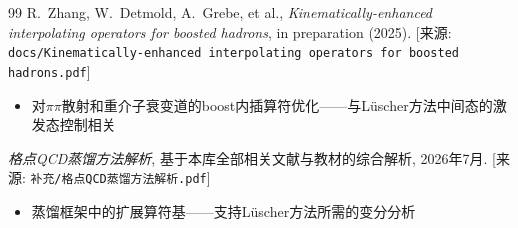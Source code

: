 \documentclass[12pt,a4paper]{ctexart}
\theoremstyle{definition}
\begin{document}
\begin{thebibliography}{99}
R.~Zhang, W.~Detmold, A.~Grebe, et al.,
\textit{Kinematically-enhanced interpolating operators for boosted hadrons},
in preparation (2025).
[来源: \texttt{docs/Kinematically-enhanced interpolating operators for boosted hadrons.pdf}]
\begin{itemize}
    \item 对$\pi\pi$散射和重介子衰变道的boost内插算符优化——与L\"uscher方法中间态的激发态控制相关
\end{itemize}

\textit{格点QCD蒸馏方法解析},
基于本库全部相关文献与教材的综合解析, 2026年7月.
[来源: \texttt{补充/格点QCD蒸馏方法解析.pdf}]
\begin{itemize}
    \item 蒸馏框架中的扩展算符基——支持L\"uscher方法所需的变分分析
\end{itemize}

\end{thebibliography}
\end{document}
